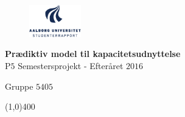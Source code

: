 \clearpage
\thispagestyle{empty}

\begin{figure}[H]
	\raggedleft
		\includegraphics[width=0.2\textwidth]{figures/aaulogo-da.png}
\end{figure} 
\vspace*{\fill} 
\begin{center}	
\begin{Huge}
\textbf{Prædiktiv model til kapacitetsudnyttelse}\\
\vspace{5 mm}
P$5$ Semestersprojekt - Efteråret $2016$\\
\vspace{3 mm}
\end{Huge}
{\Large Gruppe $5405$}
\end{center}
\vspace*{\fill}

\begin{center}
\line(1,0){400}
\end{center}

